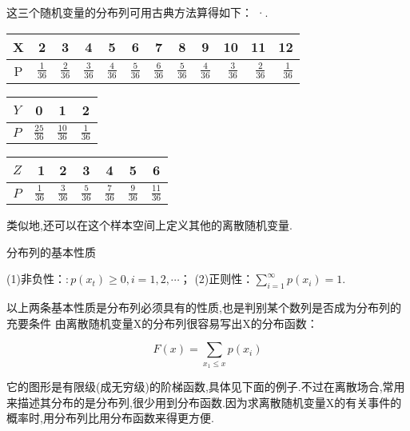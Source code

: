 这三个随机变量的分布列可用古典方法算得如下：
·.
\begin{table}[htbp]
	\centering
	\begin{tabular}{c|cccccrrrrrr}
		X     & 2     & 3     & 4     & 5     & 6     & \multicolumn{1}{c}{7} & \multicolumn{1}{c}{8} & \multicolumn{1}{c}{9} & \multicolumn{1}{c}{10} & \multicolumn{1}{c}{11} & \multicolumn{1}{c}{12} \\\hline
		P     &   $ \frac{1}{36} $    &   $ \frac{2}{36} $    &   $ \frac{3}{36} $    &   $ \frac{4}{36} $    &    $ \frac{5}{36} $   &   $ \frac{6}{36} $    &   $ \frac{5}{36} $    &    $ \frac{4}{36} $   &    $ \frac{3}{36} $   &    $ \frac{2}{36} $   &  $ \frac{1}{36} $\\
	\end{tabular}%
	
	\begin{tabular}{c|ccc}
		$ Y $     & 0     & 1     & 2 \\\hline
		$ P $     &  $ \frac{25}{36} $     &    $ \frac{10}{36} $   & $ \frac{1}{36} $ \\
	\end{tabular}%
	
	\begin{tabular}{c|rccccc}
		$ Z $     & 1 & 2     & 3     & 4     & 5     & 6 \\\hline
		$ P $     &   $ \frac{1}{36} $    &   $ \frac{3}{36} $    &   $ \frac{5}{36} $    &   $ \frac{7}{36} $    &   $ \frac{9}{36} $    &  $ \frac{11}{36} $\\
	\end{tabular}%
\end{table}%


类似地,还可以在这个样本空间上定义其他的离散随机变量.

分布列的基本性质


(1)非负性：$: p\left(x_{t}\right) \geqslant 0, i=1,2, \cdots$；
(2)正则性：$\sum_{i=1}^{\infty} p\left(x_{i}\right)=1$.

以上两条基本性质是分布列必须具有的性质,也是判别某个数列是否成为分布列的充要条件
由离散随机变量X的分布列很容易写出X的分布函数：

\[ 
F(x)=\sum_{x_{1} \leqslant x} p\left(x_{i}\right)
\]

它的图形是有限级(成无穷级)的阶梯函数,具体见下面的例子.不过在离散场合,常用来描述其分布的是分布列,很少用到分布函数.因为求离散随机变量X的有关事件的概率时,用分布列比用分布函数来得更方便.


